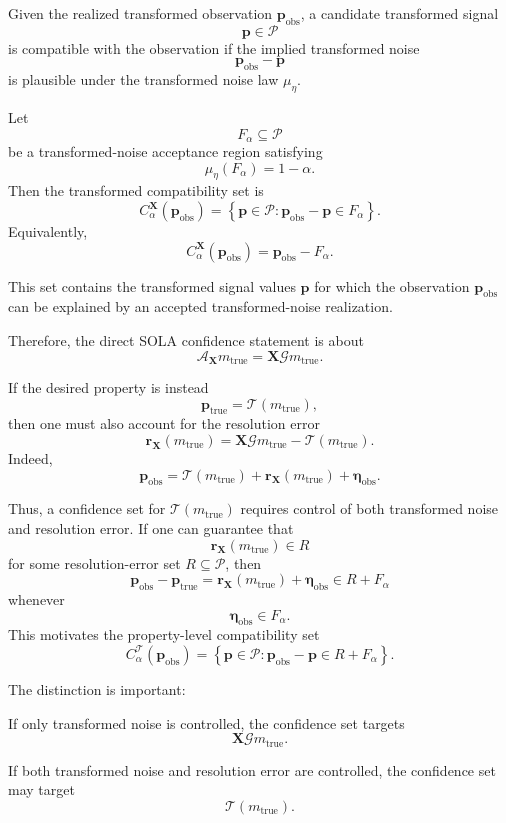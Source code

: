 \documentclass[11pt]{article}
\newcommand{\Pspace}{\mathcal P}
\newcommand{\ptrue}{\mathbf p_{\mathrm{true}}}
\newcommand{\pobs}{\mathbf p_{\mathrm{obs}}}
\newcommand{\G}{\mathcal G}
\newcommand{\Tau}{\mathcal T}
\newcommand{\X}{\mathbf X}
\newcommand{\A}{\mathcal A}
\begin{document}
Given the realized transformed observation \(\pobs\), a candidate transformed signal
\[
    \mathbf p\in\Pspace
\]
is compatible with the observation if the implied transformed noise
\[
    \pobs-\mathbf p
\]
is plausible under the transformed noise law \(\mu_{\eta}\).

Let
\[
    F_{\alpha}\subseteq\Pspace
\]
be a transformed-noise acceptance region satisfying
\[
    \mu_{\eta}(F_{\alpha})=1-\alpha.
\]
Then the transformed compatibility set is
\[
    C_{\alpha}^{\X}(\pobs)
    =
    \left\{
        \mathbf p\in\Pspace:
        \pobs-\mathbf p\in F_{\alpha}
    \right\}.
\]
Equivalently,
\[
    C_{\alpha}^{\X}(\pobs)
    =
    \pobs-F_{\alpha}.
\]

This set contains the transformed signal values \(\mathbf p\) for which the observation \(\pobs\) can be explained by an accepted transformed-noise realization.

Therefore, the direct SOLA confidence statement is about
\[
    \A_{\X}m_{\mathrm{true}}
    =
    \X\G m_{\mathrm{true}}.
\]

If the desired property is instead
\[
    \ptrue
    =
    \Tau(m_{\mathrm{true}}),
\]
then one must also account for the resolution error
\[
    \mathbf r_{\X}(m_{\mathrm{true}})
    =
    \X\G m_{\mathrm{true}}
    -
    \Tau(m_{\mathrm{true}}).
\]
Indeed,
\[
    \pobs
    =
    \Tau(m_{\mathrm{true}})
    +
    \mathbf r_{\X}(m_{\mathrm{true}})
    +
    \boldsymbol{\eta}_{\mathrm{obs}}.
\]

Thus, a confidence set for \(\Tau(m_{\mathrm{true}})\) requires control of both transformed noise and resolution error. If one can guarantee that
\[
    \mathbf r_{\X}(m_{\mathrm{true}})\in R
\]
for some resolution-error set \(R\subseteq\Pspace\), then
\[
    \pobs-\ptrue
    =
    \mathbf r_{\X}(m_{\mathrm{true}})
    +
    \boldsymbol{\eta}_{\mathrm{obs}}
    \in
    R+F_{\alpha}
\]
whenever
\[
    \boldsymbol{\eta}_{\mathrm{obs}}\in F_{\alpha}.
\]
This motivates the property-level compatibility set
\[
    C_{\alpha}^{\Tau}(\pobs)
    =
    \left\{
        \mathbf p\in\Pspace:
        \pobs-\mathbf p\in R+F_{\alpha}
    \right\}.
\]

The distinction is important:
\begin{description}[leftmargin=3.5cm,style=nextline]
    \item[Approximate-property confidence.]
    If only transformed noise is controlled, the confidence set targets
    \[
        \X\G m_{\mathrm{true}}.
    \]

    \item[Desired-property confidence.]
    If both transformed noise and resolution error are controlled, the confidence set may target
    \[
        \Tau(m_{\mathrm{true}}).
    \]
\end{description}
\end{document}
